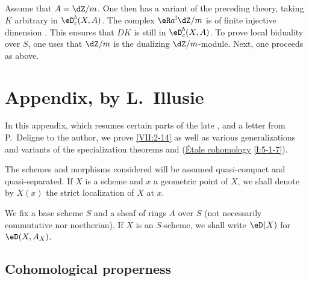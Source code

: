 \subsection{}\label{VII:4-7}

Assume that $A=\dZ/m$. One then has a variant of the preceding
theory, taking $K$ arbitrary in $\eD_c^b(X,A)$. The complex
$\eR a^! \dZ/m$ is of finite injective dimension \cite[XVIII 3.1.7]{sga4}. This
ensures that $D K$ is still in $\eD_c^b(X,A)$. To prove local biduality
over $S$, one uses that $\dZ/m$ is the dualizing $\dZ/m$-module.
Next, one proceeds as above.










\section{Appendix, by L.\ Illusie}\label{VII:5}

In this appendix, which resumes certain parts of the late \cite[II]{sga5}, and
a letter from P.\ Deligne to the author, we prove \ref{VII:2-14} as well as
various generalizations and variants of the specialization theorems
\cite[XVI 2.1]{sga4} and (\hyperref[I]{\'Etale cohomology} \ref{I:5-1-7}).

The schemes and morphisms considered will be assumed quasi-compact and
quasi-separated. If $X$ is a scheme and $x$ a geometric point of
$X$, we shall denote by $X(x)$ the strict localization of $X$ at $x$.

We fix a base scheme $S$ and a sheaf of rings $A$ over $S$ (not
necessarily commutative nor noetherian). If $X$ is an $S$-scheme, we
shall write $\eD(X)$ for $\eD(X,A_X)$.




\subsection{Cohomological properness}\label{VII:5-1}




